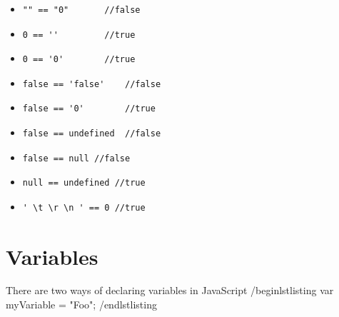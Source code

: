 \documentclass {amsart}
\begin{document}
		\begin{itemize}
			\item \begin{lstlisting} 
"" == "0" 		//false
				\end{lstlisting} 

			\item \begin{lstlisting} 
0 == '' 		//true
				\end{lstlisting} 

			\item \begin{lstlisting} 
0 == '0' 		//true
				\end{lstlisting} 
		\end{itemize}


		\begin{itemize}
			\item \begin{lstlisting} 
false == 'false' 	//false 
				\end{lstlisting}

			\item \begin{lstlisting} 
false == '0'	 	//true
				\end{lstlisting} 
		\end{itemize}


		\begin{itemize}
			\item \begin{lstlisting} 
false == undefined 	//false
				\end{lstlisting} 

			\item \begin{lstlisting} 
false == null //false
				\end{lstlisting} 

			\item \begin{lstlisting} 
null == undefined //true
				\end{lstlisting} 

			\item \begin{lstlisting} 
' \t \r \n ' == 0 //true
				\end{lstlisting} 

		\end{itemize}

\section{Variables}
	There are two ways of declaring variables in JavaScript 
	/begin{lstlisting}
		var myVariable = "Foo";
	/end{lstlisting}
\end{document}
